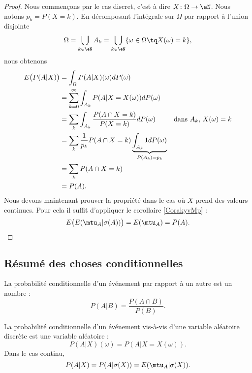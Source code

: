 \begin{proof}
    Nous commençons par le cas discret, c'est à dire \( X\colon \Omega\to \eN\). Nous notons \( p_k=P(X=k)\). En décomposant l'intégrale sur \( \Omega\) par rapport à l'union disjointe
    \begin{equation}
        \Omega=\bigcup_{k\in \eN}A_k=\bigcup_{k\in \eN}\{ \omega\in\Omega \tq X(\omega)=k\},
    \end{equation}
    nous obtenons
    \begin{subequations}
        \begin{align}
            E\big( P(A|X) \big)&=\int_{\Omega}P(A|X)(\omega)dP(\omega)\\
            &=\sum_{k=0}^{\infty}\int_{A_k}P(A|X=X(\omega))dP(\omega)\\
            &=\sum_k\int_{A_k}\frac{ P(A\cap X=k) }{ P(X=k) }dP(\omega) & \text{dans \( A_k\), \( X(\omega)=k\)}\\
            &=\sum_k\frac{1}{ p_k }P(A\cap X=k)\underbrace{\int_{A_k}1dP(\omega)}_{P(A_k)=p_k}\\
            &=\sum_{k}P(A\cap X=k)\\
            &=P(A).
        \end{align}
    \end{subequations}
    Nous devons maintenant prouver la propriété dans le cas où \( X\) prend des valeurs continues. Pour cela il suffit d'appliquer le corollaire \ref{CorakyvMp} :
    \begin{equation}
        E\big( E(\mtu_A|\sigma(A)) \big)=E(\mtu_A)=P(A).
    \end{equation}
\end{proof}

\subsection{Résumé des choses conditionnelles}

La probabilité conditionnelle d'un événement par rapport à un autre est un nombre :
\begin{equation}
    P(A|B)=\frac{ P(A\cap B) }{ P(B) }.
\end{equation}

La probabilité conditionnelle d'un événement vis-à-vis d'une variable aléatoire discrète est une variable aléatoire :
\begin{equation}
    P(A|X)(\omega)=P(A|X=X(\omega)).
\end{equation}
Dans le cas continu,
\begin{equation}
    P(A|X)=P(A|\sigma(X))=E(\mtu_A|\sigma(X)).
\end{equation}

